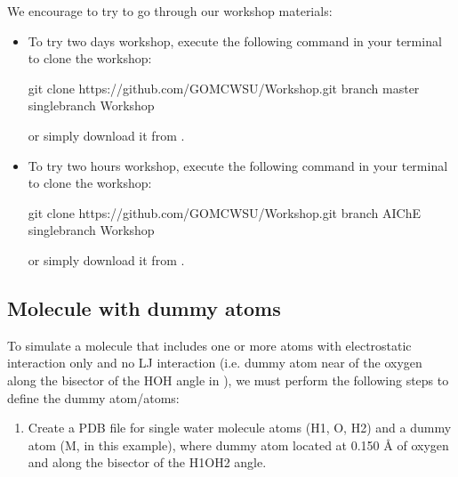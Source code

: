 \documentclass[letterpaper,10pt,english]{sphinxmanual}
\begin{document}
We encourage to try to go through our workshop materials:
\begin{itemize}
\item {} 
To try two days workshop, execute the following command in your terminal to clone the workshop:

\begin{sphinxVerbatim}[commandchars=\\\{\}]
\PYGZdl{} git  clone    https://github.com/GOMC\PYGZhy{}WSU/Workshop.git \PYGZhy{}\PYGZhy{}branch master \PYGZhy{}\PYGZhy{}single\PYGZhy{}branch
\PYGZdl{}    Workshop
\end{sphinxVerbatim}

or simply download it from  .

\item {} 
To try two hours workshop, execute the following command in your terminal to clone the workshop:

\begin{sphinxVerbatim}[commandchars=\\\{\}]
\PYGZdl{} git  clone    https://github.com/GOMC\PYGZhy{}WSU/Workshop.git \PYGZhy{}\PYGZhy{}branch AIChE \PYGZhy{}\PYGZhy{}single\PYGZhy{}branch
\PYGZdl{}    Workshop
\end{sphinxVerbatim}

or simply download it from  .

\end{itemize}


\subsection{Molecule with dummy atoms}
\label{\detokenize{howto:molecule-with-dummy-atoms}}
To simulate a molecule that includes one or more atoms with electrostatic interaction only and no LJ interaction (i.e. dummy atom near of the oxygen along
the bisector of the HOH angle in ), we must perform the following steps
to define the dummy atom/atoms:
\begin{enumerate}
%
\item {} 
Create a PDB file for single water molecule atoms (H1, O, H2) and a dummy atom (M, in this example), where dummy atom located at 0.150 Å of oxygen and along
the bisector of the H1\sphinxhyphen{}O\sphinxhyphen{}H2 angle.

\end{enumerate}
\end{document}
